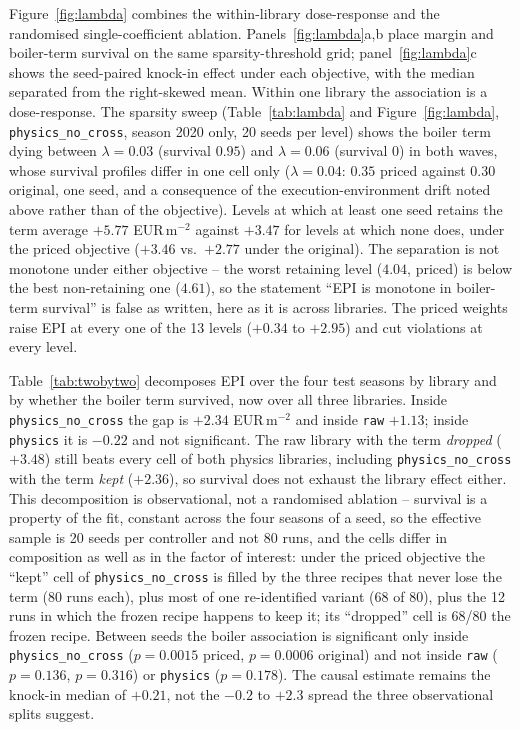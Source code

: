 Figure~\ref{fig:lambda} combines the within-library dose-response and the randomised
single-coefficient ablation. Panels~\ref{fig:lambda}a,b place margin and boiler-term
survival on the same sparsity-threshold grid; panel~\ref{fig:lambda}c shows the
seed-paired knock-in effect under each objective, with the median separated from the
right-skewed mean. Within one library the association is a dose-response. The sparsity sweep
(Table~\ref{tab:lambda} and Figure~\ref{fig:lambda}, \texttt{physics\_no\_cross}, season
2020 only, 20 seeds per level) shows the boiler term dying between $\lambda=0.03$
(survival $0.95$) and $\lambda=0.06$ (survival $0$) in both waves, whose survival profiles
differ in one cell only ($\lambda=0.04$: $0.35$ priced against $0.30$ original, one seed,
and a consequence of the execution-environment drift noted above rather than of the
objective). Levels at which at least one seed retains the term average $+5.77$
EUR\,m$^{-2}$ against $+3.47$ for levels at which none does, under the priced objective
($+3.46$ vs.\ $+2.77$ under the original). The separation is not monotone under either
objective -- the worst retaining level ($4.04$, priced) is below the best non-retaining one
($4.61$), so the statement ``EPI is monotone in boiler-term survival'' is false as
written, here as it is across libraries. The priced weights raise EPI at every one of the
13 levels ($+0.34$ to $+2.95$) and cut violations at every level.

Table~\ref{tab:twobytwo} decomposes EPI over the four test seasons by library and by
whether the boiler term survived, now over all three libraries. Inside
\texttt{physics\_no\_cross} the gap is $+2.34$ EUR\,m$^{-2}$ and inside \texttt{raw}
$+1.13$; inside \texttt{physics} it is $-0.22$ and not significant. The raw library with
the term \emph{dropped} ($+3.48$) still beats every cell of both physics libraries,
including \texttt{physics\_no\_cross} with the term \emph{kept} ($+2.36$), so survival does
not exhaust the library effect either. This decomposition is observational, not a
randomised ablation -- survival is a property of the fit, constant across the four seasons
of a seed, so the effective sample is 20 seeds per controller and not 80 runs, and the
cells differ in composition as well as in the factor of interest: under the priced
objective the ``kept'' cell of \texttt{physics\_no\_cross} is filled by the three recipes
that never lose the term (80 runs each), plus most of one re-identified variant (68 of 80),
plus the 12 runs in which the frozen recipe happens to keep it; its ``dropped'' cell is
68/80 the frozen recipe. Between seeds the boiler
association is significant only inside \texttt{physics\_no\_cross} ($p=0.0015$ priced,
$p=0.0006$ original) and not inside \texttt{raw} ($p=0.136$, $p=0.316$) or
\texttt{physics} ($p=0.178$). The causal estimate remains the knock-in median of $+0.21$,
not the $-0.2$ to $+2.3$ spread the three observational splits suggest.

